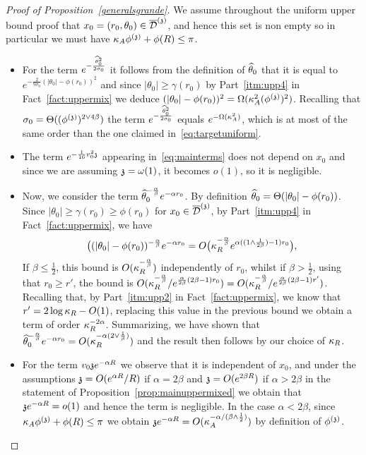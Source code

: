 \begin{proof}[Proof of Proposition~\ref{generalsgrande}]
We assume throughout the uniform upper bound proof that $x_0=(r_0,\theta_0)\in\ndt$, and hence this set is non empty so in particular we must have $\KA\phis+\phi(R)\leq\pi$.
\begin{itemize}\setlength\itemsep{1ex}
    \item For the term $e^{-\frac{\hatt^2}{2\sigma_0}}$ it follows from the definition of $\hatt$ that it is equal to $e^{-\frac{2}{9\sigma_0}(|\theta_0|-\phi(r_0))^2}$ and since $|\theta_0|\ge \gamma(r_0)$ by Part~\eqref{itm:upp4} in Fact~\ref{fact:uppermix} we deduce $(|\theta_0|-\phi(r_0))^2=\Omega(\KA^2(\phis)^2)$.
    Recalling that $\sigma_0=\Theta((\phis)^{2\vee4\beta})$ the term $e^{-\frac{\hatt^2}{2\sigma_0}}$ equals $e^{-\Omega(\KA^2)}$, which is at most of the same order than the one claimed in~\eqref{eq:targetuniform}.
    \item The term $e^{-\frac{1}{16}v_0^2\ss}$ appearing in~\eqref{eq:mainterms}  does not depend on $x_0$ and since we are assuming $\ss=\omega(1)$, it becomes $o(1)$, so it is negligible.
    \item Now, we consider the term $\hatt^{-\frac{\alpha}{\beta}}e^{-\alpha r_0}$. By definition $\hatt=\Theta(|\theta_0|-\phi(r_0))$.
    Since $|\theta_0|\ge\gamma(r_0)\ge\phi(r_0)$ for $x_0\in\ndt$, by 
    Part~\eqref{itm:upp4} in Fact~\ref{fact:uppermix}, we have
    \[
    \big((|\theta_0|-\phi(r_0))^{-\frac{\alpha}{\beta}}e^{-\alpha r_0}=O\big(\KR^{-\frac{\alpha}{\beta}}e^{\alpha((1\wedge\frac{1}{2\beta})-1)r_0}\big),\]
    If $\beta\leq\frac{1}{2}$, this bound is $O(\KR^{-\frac{\alpha}{\beta}})$ independently of $r_0$, whilst if $\beta>\frac{1}{2}$, using that $r_0\ge r'$, the bound is $O(\KR^{-\frac{\alpha}{\beta}}/e^{\frac{\alpha}{2\beta}(2\beta-1)r_0})=O(\KR^{-\frac{\alpha}{\beta}}/e^{\frac{\alpha}{2\beta}(2\beta-1)r'})$. Recalling that, by Part~\eqref{itm:upp2} in Fact~\ref{fact:uppermix}, we know that $r'=2\log\KR-O(1)$, replacing this value in the previous bound we obtain a term of order $\KR^{-2\alpha}$. Summarizing, we have shown that $\hatt^{-\frac{\alpha}{\beta}}e^{-\alpha r_0}=O(\KR^{-\alpha(2\vee\frac{1}{\beta})})$ and the result then follows by our choice of $\KR$.
    \item For the term $v_0\ss e^{-\alpha R}$ we observe that it is independent of $x_0$, and under the assumptions $\ss=O(e^{\alpha R}/R)$ if $\alpha=2\beta$ and $\ss=O(e^{2\beta R})$ if $\alpha>2\beta$ in the statement of Proposition~\ref{prop:mainuppermixed} we obtain that $\ss e^{-\alpha R}=o(1)$ and hence the term is negligible. In the case $\alpha<2\beta$, since $\KA\phis+\phi(R)\leq\pi$ we obtain $\ss e^{-\alpha R}=O(\KA^{-\alpha/(\beta\wedge\frac12)})$ by definition of $\phis$.

\end{itemize}
\end{proof}
